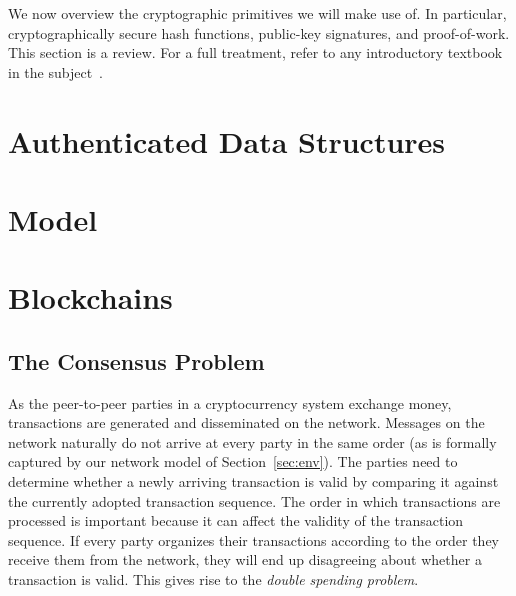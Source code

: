 We now overview the cryptographic primitives we will make use of. In particular,
cryptographically secure hash functions, public-key signatures, and
proof-of-work. This section is a review. For a full
treatment, refer to any introductory textbook in the subject~\cite{katz,handbook,foundations1,foundations2}.





\section{Authenticated Data Structures}


\section{Model}






\section{Blockchains}
\subsection{The Consensus Problem}
As the peer-to-peer parties in a cryptocurrency system exchange money,
transactions are generated and disseminated on the network. Messages on the
network naturally do not arrive at every party in the same order (as is
formally captured by our network model of Section~\ref{sec:env}).
The parties need to determine whether a newly arriving transaction is valid by
comparing it against the currently adopted transaction sequence.
The order in which transactions are processed is important because it can affect
the validity of the transaction sequence. If every party organizes their
transactions according to the order they receive them from the network, they
will end up disagreeing about whether a transaction is valid. This gives rise to
the \emph{double spending problem}.

